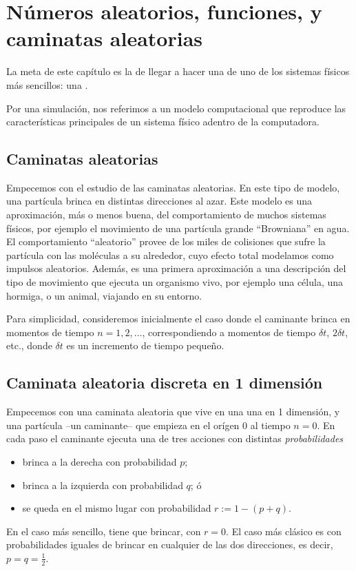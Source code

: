 \chapter{Números aleatorios, funciones, y caminatas aleatorias}

La meta de este capítulo es la de llegar a hacer una  de uno de
los sistemas físicos más sencillos: una .

Por una simulación, nos referimos a un modelo computacional que reproduce las
características principales de un sistema físico adentro de la computadora.

\section{Caminatas aleatorias}


Empecemos con el estudio de las caminatas aleatorias.
En este tipo de modelo, una partícula brinca en distintas direcciones al azar.
Este modelo es una aproximación, más o menos buena, del comportamiento de muchos
sistemas físicos, por ejemplo el movimiento de una partícula grande
``Browniana'' en agua. 
El comportamiento ``aleatorio'' provee de los miles de colisiones que sufre la
partícula con las moléculas a su alrededor, cuyo efecto total modelamos como 
impulsos aleatorios.
Además, es una primera aproximación a una descripción del
tipo de movimiento que ejecuta un organismo vivo, por ejemplo una célula, una
hormiga, o un animal, viajando en su entorno.

Para simplicidad, consideremos inicialmente el caso donde el caminante brinca
en momentos de tiempo  $n=1, 2, \ldots$, correspondiendo a
momentos de tiempo $\delta t$, $2 \delta t$, etc., donde $\delta t$ es un
incremento de tiempo pequeño.
% 

\section{Caminata aleatoria discreta en 1 dimensión}
Empecemos con una caminata aleatoria  que vive en una 
una  en 1 dimensión, y una partícula --un
caminante-- que empieza en el orígen $0$ al tiempo $n=0$.
En cada paso el caminante ejecuta una de tres acciones con distintas
\emph{probabilidades}
\begin{itemize}
 \item  brinca a la derecha con probabilidad $p$;
\item brinca a la izquierda con probabilidad $q$; ó
\item se queda en el mismo lugar con probabilidad $r := 1-(p+q)$.
\end{itemize}
En el caso más sencillo, tiene que brincar, con $r=0$. El caso más clásico es
con probabilidades iguales de brincar en cualquier de las dos direcciones, es
decir, $p=q=\textstyle \frac{1}{2}$.


